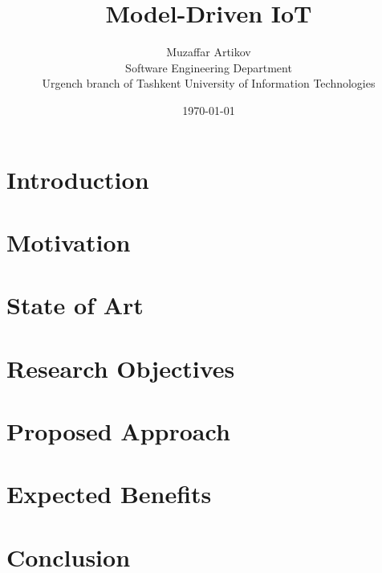 \documentclass[10pt, oneside]{article}
\title{Model-Driven IoT}
\author{Muzaffar Artikov\\
Software Engineering Department\\
Urgench branch of Tashkent University of Information Technologies}
\date{\today}
\begin{document}
\maketitle

\section{Introduction}
\label{sec:introduction}
\section{Motivation}
\label{sec:motivation}
\section{State of Art}
\label{sec:stateofart}
\section{Research Objectives}
\label{sec:researchObjectives}
\section{Proposed Approach}
\label{sec:proposedApproach}
\section{Expected Benefits}
\label{sec:expectedBenefits}
\section{Conclusion}
\label{sec:conclusion}



\end{document}
